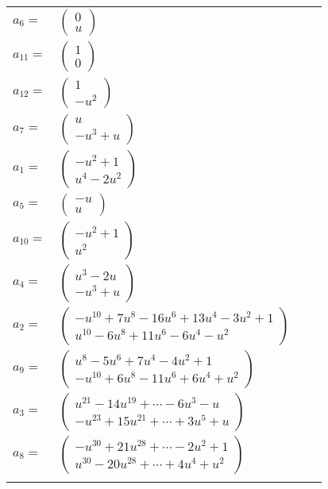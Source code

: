 \documentclass[1p]{elsarticle_modified}
\theoremstyle{definition}
\begin{document}
\begin{tabular}{m{7pt} m{180pt} m{7pt} m{180pt} }
\flushright $a_{6}=$&$\begin{pmatrix}0\\u\end{pmatrix}$ \\
\flushright $a_{11}=$&$\begin{pmatrix}1\\0\end{pmatrix}$ \\
\flushright $a_{12}=$&$\begin{pmatrix}1\\- u^2\end{pmatrix}$ \\
\flushright $a_{7}=$&$\begin{pmatrix}u\\- u^3+u\end{pmatrix}$ \\
\flushright $a_{1}=$&$\begin{pmatrix}- u^2+1\\u^4-2 u^2\end{pmatrix}$ \\
\flushright $a_{5}=$&$\begin{pmatrix}- u\\u\end{pmatrix}$ \\
\flushright $a_{10}=$&$\begin{pmatrix}- u^2+1\\u^2\end{pmatrix}$ \\
\flushright $a_{4}=$&$\begin{pmatrix}u^3-2 u\\- u^3+u\end{pmatrix}$ \\
\flushright $a_{2}=$&$\begin{pmatrix}- u^{10}+7 u^8-16 u^6+13 u^4-3 u^2+1\\u^{10}-6 u^8+11 u^6-6 u^4- u^2\end{pmatrix}$ \\
\flushright $a_{9}=$&$\begin{pmatrix}u^8-5 u^6+7 u^4-4 u^2+1\\- u^{10}+6 u^8-11 u^6+6 u^4+u^2\end{pmatrix}$ \\
\flushright $a_{3}=$&$\begin{pmatrix}u^{21}-14 u^{19}+\cdots-6 u^3- u\\- u^{23}+15 u^{21}+\cdots+3 u^5+u\end{pmatrix}$ \\
\flushright $a_{8}=$&$\begin{pmatrix}- u^{30}+21 u^{28}+\cdots-2 u^2+1\\u^{30}-20 u^{28}+\cdots+4 u^4+u^2\end{pmatrix}$\\&\end{tabular}
\end{document}
